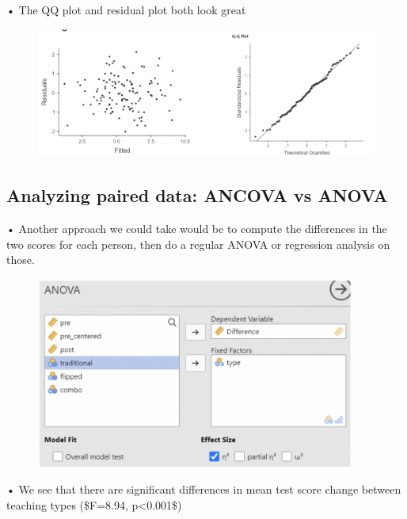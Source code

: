 \documentclass[
  letterpaper,
  DIV=11,
  numbers=noendperiod]{scrreprt}
\begin{document}
• The QQ plot and residual plot both look great

\begin{figure}

{\centering \includegraphics{images/Mod5_26.png}

}

\end{figure}

\hypertarget{analyzing-paired-data-ancova-vs-anova}{%
\subsection{Analyzing paired data: ANCOVA vs
ANOVA}\label{analyzing-paired-data-ancova-vs-anova}}

• Another approach we could take would be to compute the differences in
the two scores for each person, then do a regular ANOVA or regression
analysis on those.

\begin{figure}

{\centering \includegraphics[width=4.13542in,height=\textheight]{images/Mod5_27.png}

}

\end{figure}

• We see that there are significant differences in mean test score
change between teaching types (\$F=8.94, p\textless0.001\$)
\end{document}
